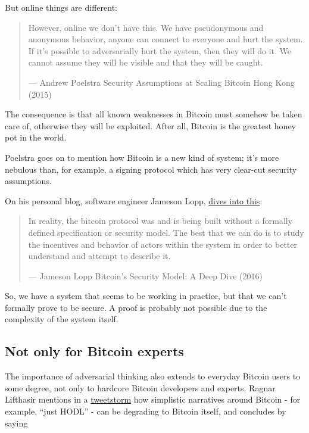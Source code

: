 But online things are different:

\begin{quote}
However, online we don't have this. We have pseudonymous and anonymous
behavior, anyone can connect to everyone and hurt the system. If it's
possible to adversarially hurt the system, then they will do it. We
cannot assume they will be visible and that they will be caught.

---  Andrew Poelstra Security Assumptions at Scaling Bitcoin Hong Kong
(2015)
\end{quote}

The consequence is that all known weaknesses in Bitcoin must somehow be
taken care of, otherwise they will be exploited. After all, Bitcoin is
the greatest honey pot in the world.

Poelstra goes on to mention how Bitcoin is a new kind of system; it's
more nebulous than, for example, a signing protocol which has very
clear-cut security assumptions.

On his personal blog, software engineer Jameson Lopp,
\href{https://blog.lopp.net/bitcoins-security-model-a-deep-dive/}{dives
into this}:

\begin{quote}
In reality, the bitcoin protocol was and is being built without a
formally defined specification or security model. The best that we can
do is to study the incentives and behavior of actors within the system
in order to better understand and attempt to describe it.

---  Jameson Lopp Bitcoin's Security Model: A Deep Dive (2016)
\end{quote}

So, we have a system that seems to be working in practice, but that we
can't formally prove to be secure. A proof is probably not possible due
to the complexity of the system itself.

\hypertarget{_not_only_for_bitcoin_experts}{%
\subsection{Not only for Bitcoin
experts}\label{_not_only_for_bitcoin_experts}}

The importance of adversarial thinking also extends to everyday Bitcoin
users to some degree, not only to hardcore Bitcoin developers and
experts. Ragnar Lifthasir mentions in a
\href{https://bitcoinwords.github.io/tweetstorm-on-adversarial-thinking}{tweetstorm}
how simplistic narratives around Bitcoin - for example, ``just HODL'' -
can be degrading to Bitcoin itself, and concludes by saying

